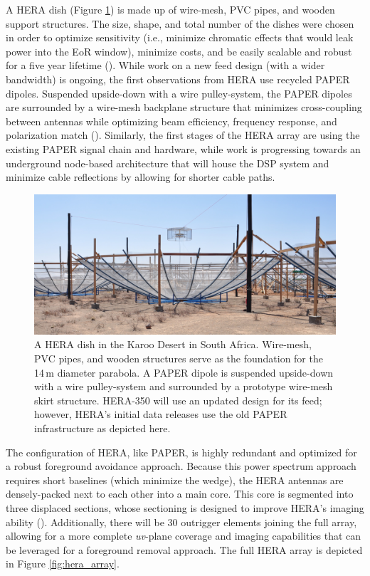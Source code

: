 A HERA dish (Figure \ref{fig:hera_dish}) is made up of wire-mesh, PVC pipes, and wooden support structures. The size, shape, and total number of the dishes were chosen in order to optimize sensitivity (i.e., minimize chromatic effects that would leak power into the EoR window), minimize costs, and be easily scalable and robust for a five year lifetime (\citealt{deboer_et_al2017}). While work on a new feed design (with a wider bandwidth) is ongoing, the first observations from HERA use recycled PAPER dipoles. Suspended upside-down with a wire pulley-system, the PAPER dipoles are surrounded by a wire-mesh backplane structure that minimizes cross-coupling between antennas while optimizing beam efficiency, frequency response, and polarization match (\citealt{deboer_et_al2017}). Similarly, the first stages of the HERA array are using the existing PAPER signal chain and hardware, while work is progressing towards an underground node-based architecture that will house the DSP system and minimize cable reflections by allowing for shorter cable paths. 

\begin{figure}
    \centering
    \includegraphics[width=1\textwidth]{plots/hera_dish.jpg}
    \caption{A HERA dish in the Karoo Desert in South Africa. Wire-mesh, PVC pipes, and wooden structures serve as the foundation for the 14\,m diameter parabola. A PAPER dipole is suspended upside-down with a wire pulley-system and surrounded by a prototype wire-mesh skirt structure. HERA-350 will use an updated design for its feed; however, HERA's initial data releases use the old PAPER infrastructure as depicted here.}
    \label{fig:hera_dish}
\end{figure}

The configuration of HERA, like PAPER, is highly redundant and optimized for a robust foreground avoidance approach. Because this power spectrum approach requires short baselines (which minimize the wedge), the HERA antennas are densely-packed next to each other into a main core. This core is segmented into three displaced sections, whose sectioning is designed to improve HERA's imaging ability (\citealt{dillon_parsons2016}). Additionally, there will be 30 outrigger elements joining the full array, allowing for a more complete \textit{uv}-plane coverage and imaging capabilities that can be leveraged for a foreground removal approach. The full HERA array is depicted in Figure \ref{fig:hera_array}. 

